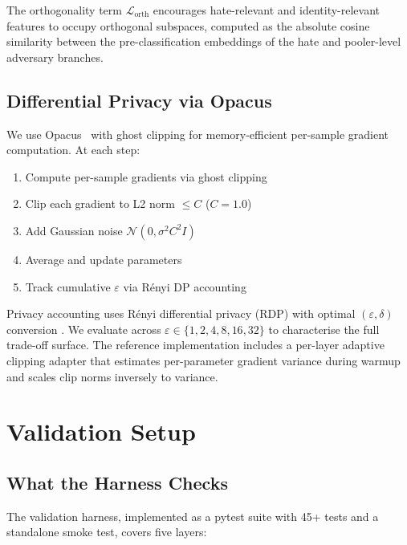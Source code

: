 \documentclass{article}
\begin{document}
The orthogonality term $\mathcal{L}_{\text{orth}}$ encourages
hate-relevant and identity-relevant features to occupy orthogonal
subspaces, computed as the absolute cosine similarity between the
pre-classification embeddings of the hate and pooler-level adversary
branches.

\subsection{Differential Privacy via Opacus}

We use Opacus~\cite{yousefpour2021opacus} with ghost clipping for
memory-efficient per-sample gradient computation. At each step:

\begin{enumerate}
  \item Compute per-sample gradients via ghost clipping
  \item Clip each gradient to L2 norm $\leq C$ ($C=1.0$)
  \item Add Gaussian noise $\mathcal{N}(0, \sigma^2 C^2 I)$
  \item Average and update parameters
  \item Track cumulative $\varepsilon$ via R\'enyi DP accounting
\end{enumerate}

Privacy accounting uses R\'enyi differential privacy (RDP) with
optimal $(\varepsilon,\delta)$ conversion \cite{abadi2016deep}.
We evaluate across $\varepsilon \in \{1, 2, 4, 8, 16, 32\}$ to
characterise the full trade-off surface.
The reference implementation includes a per-layer adaptive clipping
adapter that estimates per-parameter gradient variance during warmup
and scales clip norms inversely to variance.


\section{Validation Setup}
\label{sec:validation}

\subsection{What the Harness Checks}

The validation harness, implemented as a pytest suite with 45+ tests and
a standalone smoke test, covers five layers:
\end{document}

